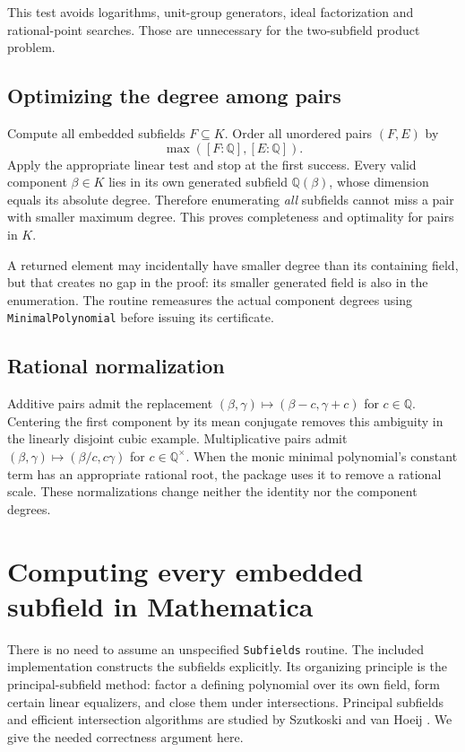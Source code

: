 \documentclass[11pt,a4paper]{article}
\newcommand{\Q}{\mathbb Q}
\newcommand{\code}[1]{\texttt{#1}}
\theoremstyle{remark}\newtheorem{remark}[theorem]{Remark}
\begin{document}
This test avoids logarithms, unit-group generators, ideal factorization and rational-point searches. Those are unnecessary for the two-subfield product problem.

\subsection{Optimizing the degree among pairs}
Compute all embedded subfields $F\subseteq K$. Order all unordered pairs $(F,E)$ by
\[
 \max([F:\Q],[E:\Q]).
\]
Apply the appropriate linear test and stop at the first success. Every valid component $\beta\in K$ lies in its own generated subfield $\Q(\beta)$, whose dimension equals its absolute degree. Therefore enumerating \emph{all} subfields cannot miss a pair with smaller maximum degree. This proves completeness and optimality for pairs in $K$.

A returned element may incidentally have smaller degree than its containing field, but that creates no gap in the proof: its smaller generated field is also in the enumeration. The routine remeasures the actual component degrees using \code{MinimalPolynomial} before issuing its certificate.

\subsection{Rational normalization}
Additive pairs admit the replacement $(\beta,\gamma)\mapsto(\beta-c,\gamma+c)$ for $c\in\Q$. Centering the first component by its mean conjugate removes this ambiguity in the linearly disjoint cubic example. Multiplicative pairs admit $(\beta,\gamma)\mapsto(\beta/c,c\gamma)$ for $c\in\Q^\times$. When the monic minimal polynomial's constant term has an appropriate rational root, the package uses it to remove a rational scale. These normalizations change neither the identity nor the component degrees.

\section{Computing every embedded subfield in Mathematica}
\label{sec:subfields}
There is no need to assume an unspecified \code{Subfields} routine. The included implementation constructs the subfields explicitly. Its organizing principle is the principal-subfield method: factor a defining polynomial over its own field, form certain linear equalizers, and close them under intersections. Principal subfields and efficient intersection algorithms are studied by Szutkoski and van Hoeij \cite{subfields}. We give the needed correctness argument here.
\end{document}
